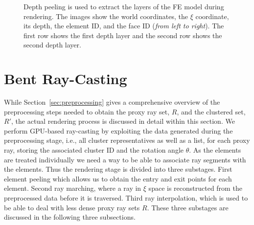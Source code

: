 \documentclass[journal]{vgtc}                %
\begin{document}
\begin{figure}[t]
    \caption{Depth peeling is used to extract the layers of the FE model during rendering. The images show the world coordinates, the $\xi$ coordinate, its depth, the element ID, and the face ID ({\it from left to right}). The first row shows the first depth layer and the second row shows the second depth layer.}
    \label{fig:depthpeeling}
\end{figure}
%
%
%
\section{Bent Ray-Casting}\label{sec:rendering}
While Section~\ref{sec:preprocessing} gives a comprehensive overview of the preprocessing steps needed to obtain the proxy ray set, $R$, and the clustered set, $R'$, the actual rendering process is discussed in detail within this section. We perform GPU-based ray-casting by exploiting the data generated during the preprocessing stage, i.e., all cluster representatives as well as a list, for each proxy ray, storing the associated cluster ID and the rotation angle $\theta$. As the elements are treated individually we need a way to be able to associate ray segments with the elements. Thus the rendering stage is divided into three substages. First element peeling which allows us to obtain the entry and exit points for each element. Second ray marching, where a ray in $\xi$ space is reconstructed from the preprocessed data before it is traversed. Third ray interpolation, which is used to be able to deal with less dense proxy ray sets $R$. These three substages are discussed in the following three subsections.
%
%
%
\end{document}
